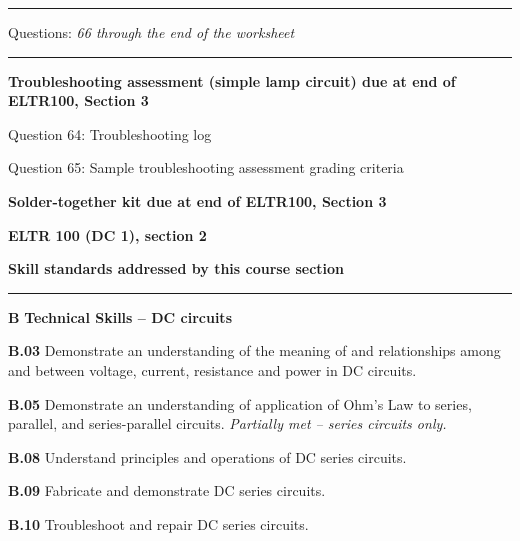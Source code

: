 \vskip 10pt
\hrule \vskip 5pt
\noindent
{}

\hskip 10pt Questions: {\it 66 through the end of the worksheet}
 
\vskip 10pt
\hrule \vskip 5pt
\noindent
{}

\hskip 10pt {\bf Troubleshooting assessment (simple lamp circuit) due at end of ELTR100, Section 3}
 
\hskip 10pt Question 64: Troubleshooting log
 
\hskip 10pt Question 65: Sample troubleshooting assessment grading criteria
 
\hskip 10pt {\bf Solder-together kit due at end of ELTR100, Section 3}

\vskip 10pt




\vfil \eject

\centerline{\bf ELTR 100 (DC 1), section 2} \bigskip 
 
\vskip 10pt

\noindent
{\bf Skill standards addressed by this course section}

\vskip 5pt

\hrule \vskip 10pt
\noindent
{}

\vskip 5pt

\medskip
\item{\bf B} {\bf Technical Skills -- DC circuits}
\item{\bf B.03} Demonstrate an understanding of the meaning of and relationships among and between voltage, current, resistance and power in DC circuits.
\item{\bf B.05} Demonstrate an understanding of application of Ohm's Law to series, parallel, and series-parallel circuits.  {\it Partially met -- series circuits only.}
\item{\bf B.08} Understand principles and operations of DC series circuits.
\item{\bf B.09} Fabricate and demonstrate DC series circuits.
\item{\bf B.10} Troubleshoot and repair DC series circuits.
\medskip

\vskip 5pt

